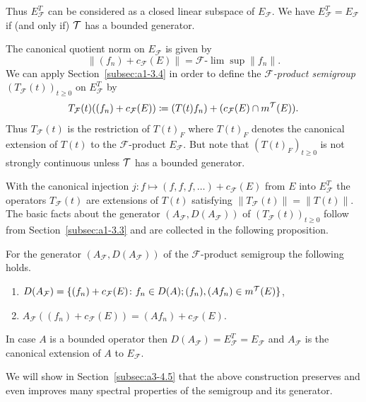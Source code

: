 Thus $E_{\mathcal{F}}^{T}$ can be considered as a closed linear subspace of\/ $E_{\mathcal{F}}$. 
We have $E_{\mathcal{F}}^{T} = E_{\mathcal{F}}$ if (and only if) $\mathcal{T}$ has a bounded generator.

The canonical quotient norm on $E_{\mathcal{F}}$ is given by
\[
    \|(f_{n}) + c_{\mathcal{F}}(E)\| = \mathcal{F}\text{-}\lim \sup \|f_{n}\| .
\]
We can apply Section~\ref{subsec:a1-3.4} in order to define the \emph{$\mathcal{F}$-product semigroup} $(T_{\mathcal{F}}(t))_{t \geq 0}$ on $E_{\mathcal{F}}^{T}$ by
\[
    T_{\mathcal{F}}(t)((f_{n}) + c_{\mathcal{F}}(E)) \coloneq (T(t)f_{n}) 
    	+ ( c_{\mathcal{F}}(E)\cap m^{\mathcal{T}}(E) ) .
\]
Thus $T_{\mathcal{F}}(t)$ is the restriction of\/ $T(t)_{F}$ where $T(t)_{F}$ denotes the canonical extension of\/ $T(t)$ to the $\mathcal{F}$-product $E_{\mathcal{F}}$. 
But note that $(T(t)_{F})_{t \geq 0}$ is not strongly continuous unless $\mathcal{T}$ has a bounded generator.

With the canonical injection $j \colon f \mapsto (f,f,f,\ldots) + c_{\mathcal{F}}(E)$ from $E$ into 
$E_{\mathcal{F}}^{T}$ the operators $T_{\mathcal{F}}(t)$ are extensions of\/ $T(t)$ satisfying $\|T_{\mathcal{F}}(t)\| = \|T(t)\|$. 
The basic facts about the generator $(A_{\mathcal{F}},D(A_{\mathcal{F}}))$ of\/ $(T_{\mathcal{F}}(t))_{t \geq 0}$ follow from Section~\ref{subsec:a1-3.3} and are collected in the following proposition.
\begin{proposition*}\label{prop:a1-3.6}
For the generator $(A_{\mathcal{F}},D(A_{\mathcal{F}}))$ of the $\mathcal{F}$-product semigroup the following holds.
\begin{enumerate}[\upshape(i)]
\item 
$D(A_{\mathcal{F}}) = \{(f_{n}) + c_{\mathcal{F}}(E) \colon f_{n} \in D(A); (f_{n}), (Af_{n}) \in m^{\mathcal{T}}(E)\}$,

\item 
$A_{\mathcal{F}}((f_{n}) + c_{\mathcal{F}}(E)) = (Af_{n}) + c_{\mathcal{F}}(E)$.

\end{enumerate}
\end{proposition*}
In case $A$ is a bounded operator then $D(A_{\mathcal{F}}) = E_{\mathcal{F}}^{T} = E_{\mathcal{F}}$ and $A_{\mathcal{F}}$ is the canonical extension of\/ $A$ to $E_{\mathcal{F}}$.

We will show in Section~\ref{subsec:a3-4.5} that the above construction preserves and even improves many spectral properties of the semigroup and its generator.
